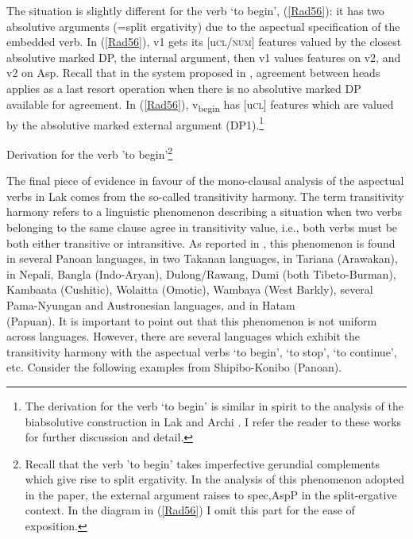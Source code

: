 \documentclass[output=paper]{langscibook}
\begin{document}
The situation is slightly different for the verb ‘to begin’, (\ref{Rad56}): it has two absolutive arguments (=split ergativity) due to the aspectual specification of the embedded verb. In (\ref{Rad56}), v1 gets its [u\textsc{cl/num}] features valued by the closest absolutive marked DP, the internal argument, then v1 values features on v2, and v2 on Asp. Recall that in the system proposed in \citet{PolinskyChumakina2017}, agreement between heads applies as a last resort operation when there is no absolutive marked DP available for agreement. In (\ref{Rad56}), v\textsubscript{begin} has [u\textsc{cl}] features which are valued by the absolutive marked external argument (DP1).\footnote{The derivation for the verb ‘to begin’ is similar in spirit to the analysis of the biabsolutive construction in Lak \citep{Radkevich2017} and Archi \citep{Polinsky2016}. I refer the reader to these works for further discussion and detail.}

\newpage
\ea\label{Rad56}
Derivation for the verb 'to begin'\footnote{Recall that the verb 'to begin' takes imperfective gerundial complements which give rise to split ergativity. In the analysis of this phenomenon adopted in the paper, the external argument raises to spec,AspP in the split-ergative context. In the diagram in (\ref{Rad56}) I omit this part for the ease of exposition.} 
\z 

The final piece of evidence in favour of the mono-clausal analysis of the aspectual verbs in Lak comes from the so-called transitivity harmony. The term transitivity harmony refers to a linguistic phenomenon describing a situation when two verbs belonging to the same clause agree in transitivity value, i.e., both verbs must be both either transitive or intransitive. As reported in \citet{Zariquiey2014}, this phenomenon is found in several Panoan languages, in two Takanan languages, in Tariana (Arawakan), in Nepali, Bangla (Indo-Aryan), Dulong/Rawang, Dumi (both Tibeto-Burman), Kambaata (Cushitic), Wolaitta (Omotic), Wambaya (West Barkly), several Pama-Nyungan and Austronesian languages, and in Hatam\\ (Papuan). It is important to point out that this phenomenon is not uniform across languages. However, there are several languages which exhibit the transitivity harmony with the aspectual verbs ‘to begin’, ‘to stop’, ‘to continue’, etc. Consider the following examples from Shipibo-Konibo (Panoan).
\end{document}
